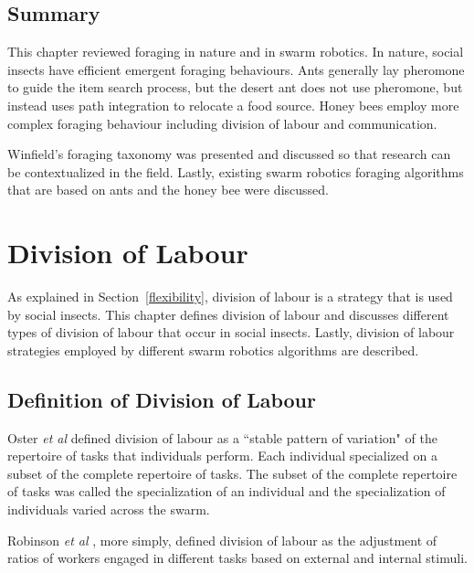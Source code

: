 \section{Summary}
\label{foraging:summary}

This chapter reviewed foraging in nature and in swarm robotics. In nature, social insects have efficient emergent foraging behaviours. Ants generally lay pheromone to guide the item search process, but the desert ant does not use pheromone, but instead uses path integration to relocate a food source. Honey bees employ more complex foraging behaviour including division of labour and communication. 

Winfield's foraging taxonomy was presented and discussed so that research can be contextualized in the field. Lastly, existing swarm robotics foraging algorithms that are based on ants and the honey bee were discussed.

\chapter{Division of Labour}
\label{chap:divisionoflabour}


As explained in Section~\ref{flexibility}, division of labour is a strategy that is used by social insects. This chapter defines division of labour and discusses different types of division of labour that occur in social insects. Lastly, division of labour strategies employed by different swarm robotics algorithms are described. 

\section{Definition of Division of Labour}
\label{division:definition}

Oster \textit{et al} \cite{oster1978caste} defined division of labour as a ``stable pattern of variation" of the repertoire of tasks that individuals perform. Each individual specialized on a subset of the complete repertoire of tasks. The subset of the complete repertoire of tasks was called the specialization of an individual and the specialization of individuals varied across the swarm. 

Robinson \textit{et al} \cite{robinson1992regulation}, more simply, defined division of labour as the adjustment of ratios of workers engaged in different tasks based on external and internal stimuli.

